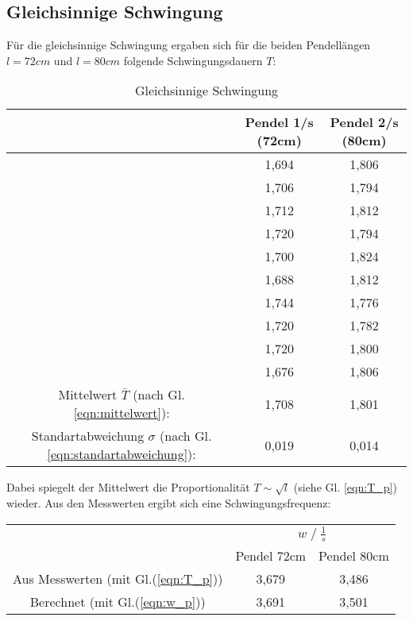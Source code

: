 \subsection{Gleichsinnige Schwingung}
Für die gleichsinnige Schwingung ergaben sich für die beiden Pendellängen $l=72cm$ und $l=80cm$
folgende Schwingungsdauern $T$:
\begin{table}
    \centering
    \label{tab:Data_gleichphasig}
    \begin{tabular}{c c | c}
        \toprule
        & Pendel 1\;/\;s (72cm) & Pendel 2\;/\;s (80cm)\\
        \midrule
            & 1,694 & 1,806 \\
            & 1,706 & 1,794 \\
            & 1,712 & 1,812 \\
            & 1,720 & 1,794 \\
            & 1,700 & 1,824 \\
            & 1,688 & 1,812 \\
            & 1,744 & 1,776 \\
            & 1,720 & 1,782 \\
            & 1,720 & 1,800 \\
            & 1,676 & 1,806 \\        
        \midrule
        Mittelwert $\bar{T}$ (nach Gl. \ref{eqn:mittelwert}): & 1,708 & 1,801 \\
        Standartabweichung $\sigma$ (nach Gl. \ref{eqn:standartabweichung}): & 0,019 & 0,014 \\
        \bottomrule
    \end{tabular}
    \caption{Gleichsinnige Schwingung}
\end{table}

Dabei spiegelt der Mittelwert die Proportionalität $T \sim \sqrt{l}$ (siehe Gl. \ref{eqn:T_p}) wieder.\newline
Aus den Messwerten ergibt sich eine Schwingungsfrequenz:
\begin{table}
    \centering
    \label{tab:frq_gleichs}
    \begin{tabular}{c c c}
        \toprule
        & \multicolumn{2}{c}{$w\;/\;\frac{1}{s}$}\\
        \cmidrule(lr){2-3} 
        & Pendel 72cm & Pendel 80cm\\
        \midrule
        Aus Messwerten (mit Gl.(\ref{eqn:T_p})) & 3,679 & 3,486 \\
        Berechnet (mit Gl.(\ref{eqn:w_p}))      & 3,691 & 3,501 \\
        \bottomrule
    \end{tabular}
\end{table}
\newpage

